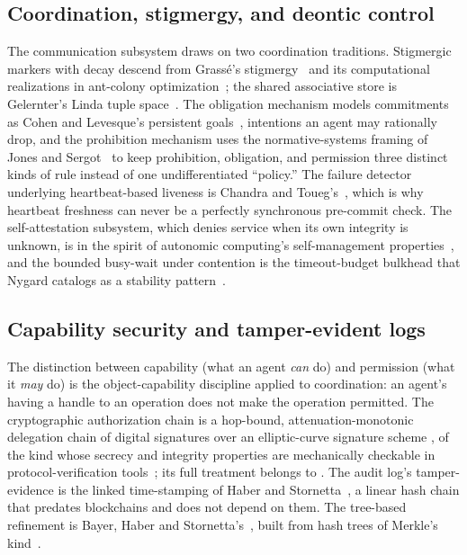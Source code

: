 \documentclass[11pt,a4paper]{article}
\theoremstyle{definition}
\theoremstyle{remark}
\begin{document}
\subsection{Coordination, stigmergy, and deontic control}

The communication subsystem draws on two coordination traditions. Stigmergic markers
with decay descend from Grass\'e's stigmergy~ and its
computational realizations in ant-colony optimization~; the shared
associative store is Gelernter's Linda tuple space~. The
obligation mechanism models commitments as Cohen and Levesque's persistent
goals~, intentions an agent may rationally drop, and
the prohibition mechanism uses the normative-systems framing of Jones and
Sergot~ to keep prohibition, obligation, and permission
three distinct kinds of rule instead of one undifferentiated ``policy.'' The failure
detector underlying heartbeat-based liveness is Chandra and Toueg's~,
which is why heartbeat freshness can never be a perfectly synchronous pre-commit
check. The self-attestation subsystem, which denies service when its own integrity is
unknown, is in the spirit of autonomic computing's self-management
properties~, and the bounded busy-wait under contention is
the timeout-budget bulkhead that Nygard catalogs as a stability
pattern~.

\subsection{Capability security and tamper-evident logs}

The distinction between capability (what an agent \emph{can} do) and permission
(what it \emph{may} do) is the object-capability discipline applied to coordination: an agent's
having a handle to an operation does not make the operation permitted. The
cryptographic authorization chain is a hop-bound, attenuation-monotonic delegation
chain of digital signatures over an elliptic-curve signature scheme
, of the kind whose secrecy and integrity properties are
mechanically checkable in protocol-verification tools~;
its full treatment belongs to . The audit log's tamper-evidence is
the linked time-stamping of Haber and Stornetta~, a
linear hash chain that predates blockchains and does not depend on them. The
tree-based refinement is Bayer, Haber and Stornetta's~,
built from hash trees of Merkle's kind~.
\end{document}
